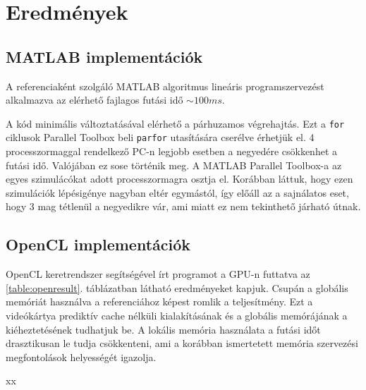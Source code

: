 \chapter{Eredmények}
	\section{MATLAB implementációk}
	A referenciaként szolgáló MATLAB algoritmus lineáris programszervezést
	alkalmazva az elérhető fajlagos futási idő $\sim100 ms$.
	
	A kód minimális változtatásával elérhető a párhuzamos végrehajtás. Ezt a
	\texttt{for} ciklusok Parallel Toolbox beli \texttt{parfor} utasítására
	cserélve érhetjük el. 4 processzormaggal rendelkező PC-n  legjobb esetben a negyedére csökkenhet a
	futási idő. Valójában ez sose történik meg.
	A MATLAB Parallel Toolbox-a az egyes szimulácókat adott processzormagra osztja el.
	Korábban láttuk, hogy ezen szimulációk lépésigénye nagyban eltér egymástól, így előáll az a
	sajnálatos eset, hogy 3 mag tétlenül a negyedikre vár, ami miatt ez nem tekinthető járható útnak. 
	
	\section{OpenCL implementációk}
	OpenCL keretrendszer segítségével írt programot a GPU-n futtatva az
	\ref{table:openresult}. táblázatban látható eredményeket kapjuk.
	Csupán a globális memóriát használva a referenciához képest romlik a
	teljesítmény. Ezt a videókártya prediktív cache nélküli kialakításának és a
	globális memórájának a kiéheztetésének tudhatjuk be.
	A lokális memória használata a futási időt drasztikusan le tudja
	csökkenteni, ami a korábban ismertetett memória szervezési megfontolások
	helyességét igazolja.



xx





